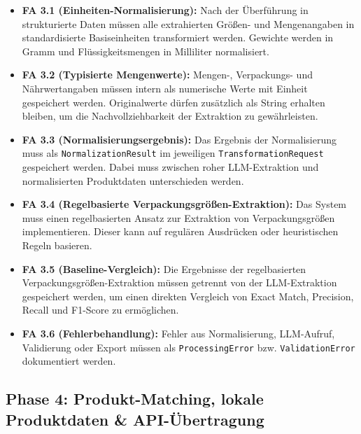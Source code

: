 \documentclass[11pt,a4paper]{article}
\begin{document}
\begin{itemize}[leftmargin=*]
    \item \textbf{FA 3.1 (Einheiten-Normalisierung):} Nach der Überführung in strukturierte Daten müssen alle extrahierten Größen- und Mengenangaben in standardisierte Basiseinheiten transformiert werden. Gewichte werden in Gramm und Flüssigkeitsmengen in Milliliter normalisiert.
    
    \item \textbf{FA 3.2 (Typisierte Mengenwerte):} Mengen-, Verpackungs- und Nährwertangaben müssen intern als numerische Werte mit Einheit gespeichert werden. Originalwerte dürfen zusätzlich als String erhalten bleiben, um die Nachvollziehbarkeit der Extraktion zu gewährleisten.
    
    \item \textbf{FA 3.3 (Normalisierungsergebnis):} Das Ergebnis der Normalisierung muss als \texttt{NormalizationResult} im jeweiligen \texttt{TransformationRequest} gespeichert werden. Dabei muss zwischen roher LLM-Extraktion und normalisierten Produktdaten unterschieden werden.
    
    \item \textbf{FA 3.4 (Regelbasierte Verpackungsgrößen-Extraktion):} Das System muss einen regelbasierten Ansatz zur Extraktion von Verpackungsgrößen implementieren. Dieser kann auf regulären Ausdrücken oder heuristischen Regeln basieren.
    
    \item \textbf{FA 3.5 (Baseline-Vergleich):} Die Ergebnisse der regelbasierten Verpackungsgrößen-Extraktion müssen getrennt von der LLM-Extraktion gespeichert werden, um einen direkten Vergleich von Exact Match, Precision, Recall und F1-Score zu ermöglichen.
    
    \item \textbf{FA 3.6 (Fehlerbehandlung):} Fehler aus Normalisierung, LLM-Aufruf, Validierung oder Export müssen als \texttt{ProcessingError} bzw. \texttt{ValidationError} dokumentiert werden.
\end{itemize}

\subsection{Phase 4: Produkt-Matching, lokale Produktdaten \& API-Übertragung}
\end{document}
